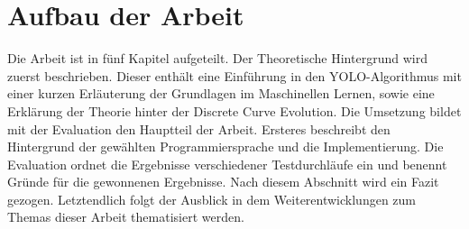 \section{Aufbau der Arbeit}
{Die Arbeit ist in fünf Kapitel aufgeteilt. Der Theoretische Hintergrund wird zuerst beschrieben. Dieser enthält eine Einführung in den YOLO-Algorithmus mit einer kurzen Erläuterung der Grundlagen im Maschinellen Lernen, sowie eine Erklärung der Theorie hinter der Discrete Curve Evolution. Die Umsetzung bildet mit der Evaluation den Hauptteil der Arbeit. Ersteres beschreibt den Hintergrund der gewählten Programmiersprache und die Implementierung. Die Evaluation ordnet die Ergebnisse verschiedener Testdurchläufe ein und benennt Gründe für die gewonnenen Ergebnisse. Nach diesem Abschnitt wird ein Fazit gezogen. Letztendlich folgt der Ausblick in dem Weiterentwicklungen zum Themas dieser Arbeit thematisiert werden. }




